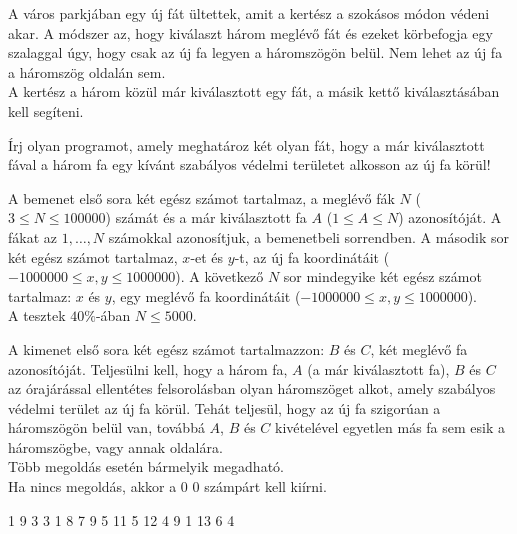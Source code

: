 





A város parkjában egy új fát ültettek, amit a kertész a szokásos módon védeni akar. A módszer az, hogy kiválaszt három meglévő fát és ezeket körbefogja egy szalaggal úgy, hogy csak az új fa legyen a háromszögön belül. Nem lehet az új fa a háromszög oldalán sem.\\
A kertész a három közül már kiválasztott egy fát, a másik kettő kiválasztásában kell segíteni.

Írj olyan programot, amely meghatároz két olyan fát, hogy a már kiválasztott fával a három fa egy kívánt szabályos védelmi területet alkosson az új fa körül!

A bemenet első sora két egész számot tartalmaz, a meglévő fák $N$ ($3 \leq N \leq 100000$) számát és a már kiválasztott fa $A$ ($1 \leq A \leq N$) azonosítóját. A fákat az $1,\ldots,N$ számokkal azonosítjuk, a bemenetbeli sorrendben. A második sor két egész számot tartalmaz, $x$-et és $y$-t, az új fa koordinátáit ($-1000000 \leq x,y \leq 1000000$). A következő $N$ sor mindegyike két egész számot tartalmaz: $x$ és $y$, egy meglévő fa koordinátáit ($-1000000 \leq x,y \leq 1000000$).\\
\smallskip
\noindent A tesztek $40 \%$-ában $N \leq 5000$.

A kimenet első sora két egész számot tartalmazzon: $B$ és $C$, két meglévő fa azonosítóját. Teljesülni kell, hogy a három fa, $A$ (a már kiválasztott fa), $B$ és $C$ az órajárással ellentétes felsorolásban olyan háromszöget alkot, amely szabályos védelmi terület az új fa körül. Tehát teljesül, hogy az új fa szigorúan a háromszögön belül van, továbbá $A$, $B$ és $C$ kivételével egyetlen más fa sem esik a háromszögbe, vagy annak oldalára.\\
Több megoldás esetén bármelyik megadható.\\
Ha nincs megoldás, akkor a $0\,\, 0$ számpárt kell kiírni.


 1
9 3
3 1
8 7
9 5
11 5
12 4
9 1
13 6
 4
\sampleCOMMENT

\sampleEND
\bigskip



